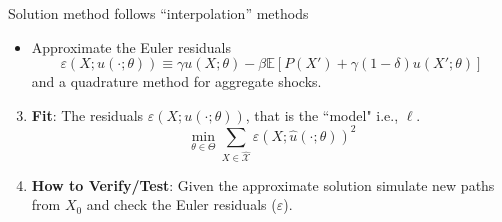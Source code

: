 \documentclass[aspectratio=169,10pt]{beamer}
\newcommand{\emphcolor}[1]{\textbf{\textcolor{emphcolorval}{#1}}}
\newcommand{\expec}[2][]{\ensuremath{\mathbb{E}_{{#1}}\left[ {#2} \right]}}
\newcommand{\Xtrain}{\hat{\mathcal{X}}}
\begin{document}
	\begin{frame}[label= algo]{Solution method follows ``interpolation'' methods}
		\begin{itemize}
			\item Approximate the Euler residuals
			$$\varepsilon\left(X;u(\cdot;\theta)\right) \equiv \gamma u(X;\theta) - \beta \mathbb{E}\left[P(X') +\gamma (1-\delta) u(X';\theta)\right]$$
			\vspace{-0.1in}
			 and a quadrature method for aggregate shocks. \hyperlink{errors}{}
		\end{itemize}
	\begin{enumerate}
		  \setcounter{enumi}{2}
		  \item \emphcolor{Fit}: The residuals $\varepsilon\left(X;u(\cdot;\theta)\right)$, that is the ``model" i.e., $\ell$.
		  $$
		  \min_{\theta \in \Theta} \sum_{X \in \Xtrain} \varepsilon\left(X;\hat{u}(\cdot;\theta)\right)^2
		    $$ 
	    \item  \emphcolor{How to Verify/Test}: Given the approximate solution simulate new paths from $X_0$ and check the Euler residuals ($\varepsilon$). 
	\end{enumerate}
	\end{frame}

	
	
	
	
\end{document}
